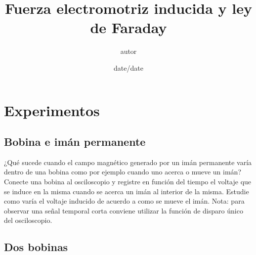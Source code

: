 \documentclass[epj]{svjour}
\def \practica {Fuerza electromotriz inducida y ley de Faraday}
\begin{document}
\title{\practica}    
\author{autor}
\date{date/date}

\maketitle

\section{Experimentos}

\subsection{Bobina e imán permanente}
¿Qué sucede cuando el campo magnético generado por un imán permanente varía dentro de
una bobina como por ejemplo cuando uno acerca o mueve un imán? Conecte una bobina al
osciloscopio y registre en función del tiempo el voltaje que se induce en la misma cuando se acerca
un imán al interior de la misma. Estudie como varía el voltaje inducido de acuerdo a como se
mueve el imán. Nota: para observar una señal temporal corta conviene utilizar la función de disparo
único del osciloscopio.

\subsection{Dos bobinas}
\end{document}
